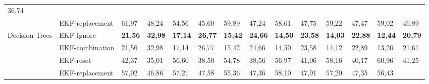 \begin{table*}[]
\begin{tabular}{@{}llllllllllllll@{}}
		\multicolumn{1}{l|}{36,74} \\ \cmidrule(l){2-14} 
		\multicolumn{1}{|l|}{} &
		\multicolumn{1}{l|}{EKF-replacement} &
		\multicolumn{1}{l|}{61,97} &
		\multicolumn{1}{l|}{48,24} &
		\multicolumn{1}{l|}{54,56} &
		\multicolumn{1}{l|}{45,60} &
		\multicolumn{1}{l|}{59,89} &
		\multicolumn{1}{l|}{47,24} &
		\multicolumn{1}{l|}{58,61} &
		\multicolumn{1}{l|}{47,75} &
		\multicolumn{1}{l|}{59,22} &
		\multicolumn{1}{l|}{47,47} &
		\multicolumn{1}{l|}{59,02} &
		\multicolumn{1}{l|}{46,89} \\ \midrule
		\multicolumn{1}{|l|}{\multirow{4}{*}{Decision Trees}} &
		\multicolumn{1}{l|}{EKF-Ignore} &
		\multicolumn{1}{l|}{\textbf{21,56}} &
		\multicolumn{1}{l|}{\textbf{32,98}} &
		\multicolumn{1}{l|}{\textbf{17,14}} &
		\multicolumn{1}{l|}{\textbf{26,77}} &
		\multicolumn{1}{l|}{\textbf{15,42}} &
		\multicolumn{1}{l|}{\textbf{24,66}} &
		\multicolumn{1}{l|}{\textbf{14,50}} &
		\multicolumn{1}{l|}{\textbf{23,58}} &
		\multicolumn{1}{l|}{\textbf{14,03}} &
		\multicolumn{1}{l|}{\textbf{22,88}} &
		\multicolumn{1}{l|}{\textbf{12,44}} &
		\multicolumn{1}{l|}{\textbf{20,79}} \\ \cmidrule(l){2-14} 
		\multicolumn{1}{|l|}{} &
		\multicolumn{1}{l|}{EKF-combination} &
		\multicolumn{1}{l|}{21,56} &
		\multicolumn{1}{l|}{32,98} &
		\multicolumn{1}{l|}{17,14} &
		\multicolumn{1}{l|}{26,77} &
		\multicolumn{1}{l|}{15,42} &
		\multicolumn{1}{l|}{24,66} &
		\multicolumn{1}{l|}{14,50} &
		\multicolumn{1}{l|}{23,58} &
		\multicolumn{1}{l|}{14,12} &
		\multicolumn{1}{l|}{22,89} &
		\multicolumn{1}{l|}{13,20} &
		\multicolumn{1}{l|}{21,61} \\ \cmidrule(l){2-14} 
		\multicolumn{1}{|l|}{} &
		\multicolumn{1}{l|}{EKF-reset} &
		\multicolumn{1}{l|}{42,37} &
		\multicolumn{1}{l|}{35,01} &
		\multicolumn{1}{l|}{56,60} &
		\multicolumn{1}{l|}{38,50} &
		\multicolumn{1}{l|}{54,78} &
		\multicolumn{1}{l|}{38,56} &
		\multicolumn{1}{l|}{56,97} &
		\multicolumn{1}{l|}{41,06} &
		\multicolumn{1}{l|}{58,16} &
		\multicolumn{1}{l|}{40,17} &
		\multicolumn{1}{l|}{60,96} &
		\multicolumn{1}{l|}{41,25} \\ \cmidrule(l){2-14} 
		\multicolumn{1}{|l|}{} &
		\multicolumn{1}{l|}{EKF-replacement} &
		\multicolumn{1}{l|}{57,02} &
		\multicolumn{1}{l|}{46,86} &
		\multicolumn{1}{l|}{57,21} &
		\multicolumn{1}{l|}{47,58} &
		\multicolumn{1}{l|}{55,36} &
		\multicolumn{1}{l|}{47,36} &
		\multicolumn{1}{l|}{58,10} &
		\multicolumn{1}{l|}{47,91} &
		\multicolumn{1}{l|}{57,20} &
		\multicolumn{1}{l|}{47,35} &
		\multicolumn{1}{l|}{56,43} &

\end{tabular}
\end{table*}

